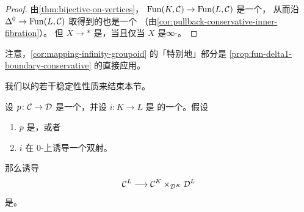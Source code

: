 \begin{proof}
由\cref{thm:bijective-on-vertices}，\trFunctor{}%
$\mathrm{Fun}(K, \mathcal{C}) \to \mathrm{Fun}(L, \mathcal{C})$ 是一个\trConservative{}\trInnerFibration{}，
从而沿 $\Delta^0 \to \mathrm{Fun}(L, \mathcal{C})$ 取\trPullback{}得到的也是一个\trConservative%
\trInnerFibration{}（由\cref{cor:pullback-conservative-inner-fibration}）。%
但 $X \to \ast$ 是\trConservative{}\trInnerFibration{}，当且仅当 $X$ 是∞-\trGroupoid{}。
\end{proof}

注意，\cref{cor:mapping-infinity-groupoid} 的「特别地」部分是
\cref{prop:fun-delta1-boundary-conservative} 的直接应用。

我们以\trIsofibration{}的若干稳定性性质来结束本节。

\begin{proposition}\label{prop:isofibration-induced-functor}
设 $p\colon \mathcal{C} \to \mathcal{D}$ 是一个\trInnerFibration{}，并设 $i\colon K \to L$ 是%
\trSimplicialSets{}的一个\trMonomorphism{}。假设
\begin{enumerate}[label=(\arabic*)]
  \item $p$ 是\trIsofibration{}，或者
  \item $i$ 在 $0$-\trSimplex{}上诱导一个双射。
\end{enumerate}
那么诱导\trFunctor{}%
\[
\mathcal{C}^L \longrightarrow \mathcal{C}^K \times_{\mathcal{D}^K} \mathcal{D}^L
\]
是\trIsofibration{}。
\end{proposition}

